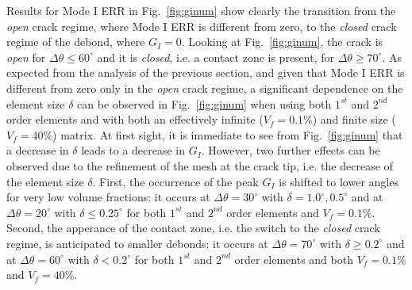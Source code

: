 \documentclass[review]{elsarticle}
\begin{document}
Results for Mode I ERR in Fig.~\ref{fig:ginum} show clearly the transition from the \emph{open} crack regime, where Mode I ERR is different from zero, to the \emph{closed} crack regime of the debond, where $G_{I}=0$. Looking at Fig.~\ref{fig:ginum}, the crack is \emph{open} for $\Delta\theta\leq60^{\circ}$ and it is \emph{closed}, i.e. a contact zone is present, for $\Delta\theta\geq70^{\circ}$. As expected from the analysis of the previous section, and given that Mode I ERR is different from zero only in the \emph{open} crack regime, a significant dependence on the element size $\delta$ can be observed in  Fig.~\ref{fig:ginum} when using both $1^{st}$ and $2^{nd}$ order elements and with both an effectively infinite ($V_{f}=0.1\%$) and finite size ($V_{f}=40\%$) matrix. At first sight, it is immediate to see from Fig.~\ref{fig:ginum} that a decrease in $\delta$ leads to a decrease in $G_{I}$. However, two further effects can be observed due to the refinement of the mesh at the crack tip, i.e. the decrease of the element size $\delta$. First, the occurrence of the peak $G_{I}$ is shifted to lower angles for very low volume fractions: it occurs at $\Delta\theta=30^{\circ}$ with $\delta=1.0^{\circ}, 0.5^{\circ}$ and at $\Delta\theta=20^{\circ}$ with $\delta\leq0.25^{\circ}$ for both $1^{st}$ and $2^{nd}$ order elements and $V_{f}=0.1\%$. Second, the apperance of the contact zone, i.e. the switch to the \emph{closed} crack regime, is anticipated to smaller debonds: it occurs at  $\Delta\theta=70^{\circ}$ with $\delta\geq0.2^{\circ}$ and at $\Delta\theta=60^{\circ}$ with $\delta<0.2^{\circ}$ for both $1^{st}$ and $2^{nd}$ order elements and both $V_{f}=0.1\%$ and $V_{f}=40\%$.
\end{document}
